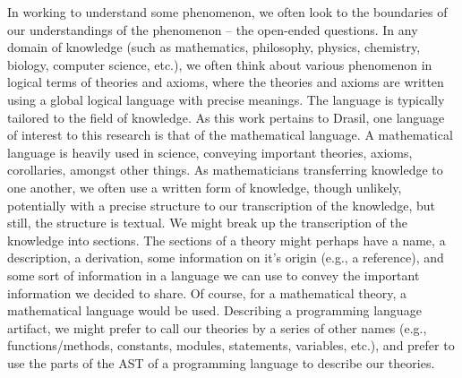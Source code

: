 
In working to understand some phenomenon, we often look to the boundaries of our
understandings of the phenomenon -- the open-ended questions. In any domain of
knowledge (such as mathematics, philosophy, physics, chemistry, biology,
computer science, etc.), we often think
about various phenomenon in logical terms of theories and axioms, where the
theories and axioms are written using a global logical language with precise
meanings. The language is typically tailored to the field of knowledge. As this
work pertains to Drasil, one language of interest to this research is that of
the mathematical language. A mathematical language is heavily used in science,
conveying important theories, axioms, corollaries, amongst other things. As
mathematicians transferring knowledge to one another, we often use a written
form of knowledge, though unlikely, potentially with a precise structure to our
transcription of the knowledge, but still, the structure is textual. We might
break up the transcription of the knowledge into sections. The sections of a
theory might perhaps have a name, a description, a derivation, some information
on it's origin (e.g., a reference), and some sort of information in a language
we can use to convey the important information we decided to share. Of course,
for a mathematical theory, a mathematical language would be used. Describing a
programming language artifact, we might prefer to call our theories by a series
of other names (e.g., functions/methods, constants, modules, statements,
variables, etc.), and prefer to use the parts of the AST of a programming
language to describe our theories.

